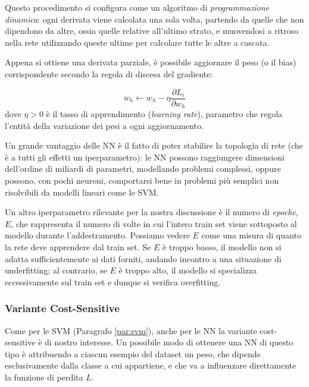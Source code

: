 Questo procedimento si configura come un algoritmo di \textit{programmazione dinamica}: ogni derivata viene calcolata una sola volta, partendo da quelle che non dipendono da altre, ossia quelle relative all'ultimo strato, e muovendosi a ritroso nella rete utilizzando queste ultime per calcolare tutte le altre a cascata.

Appena si ottiene una derivata parziale, è possibile aggiornare il peso (o il bias) corrispondente secondo la regola di discesa del gradiente:  

\begin{equation}
    w_h \leftarrow w_h - \eta \frac{\partial L_i}{\partial w_h}
\end{equation}
dove $\eta > 0$ è il tasso di apprendimento (\textit{learning rate}), parametro che regola l’entità della variazione dei pesi a ogni aggiornamento.

Un grande vantaggio delle NN è il fatto di poter stabilire la topologia di rete (che è a tutti gli effetti un iperparametro): le NN possono raggiungere dimensioni dell'ordine di miliardi di parametri, modellando problemi complessi, oppure possono, con pochi neuroni, comportarsi bene in problemi più semplici non risolvibili da modelli lineari come le SVM.

Un altro iperparametro rilevante per la nostra discussione è il numero di \textit{epoche}, $E$, che rappresenta il numero di volte in cui l'intero train set viene sottoposto al modello durante l'addestramento. Possiamo vedere $E$ come una misura di quanto la rete deve apprendere dal train set. Se $E$ è troppo basso, il modello non si adatta sufficientemente ai dati forniti, andando incontro a una situazione di underfitting; al contrario, se $E$ è troppo alto, il modello si specializza eccessivamente sul train set e dunque si verifica overfitting.

\subsubsection{Variante Cost-Sensitive}
Come per le SVM (Paragrafo \ref{par:svm}), anche per le NN la variante cost-sensitive è di nostro interesse.
Un possibile modo di ottenere una NN di questo tipo è attribuendo a ciascun esempio del dataset un peso, che dipende esclusivamente dalla classe a cui appartiene, e che va a influenzare direttamente la funzione di perdita $L$.

